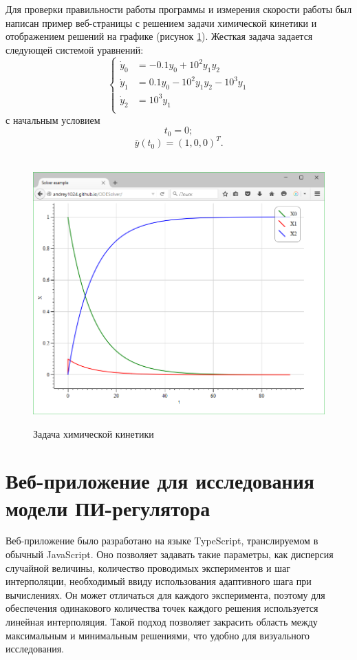 \documentclass[oneside,final,14pt]{extreport}
\begin{document}
Для проверки правильности работы программы и измерения скорости работы был написан пример веб-страницы с решением задачи химической кинетики и отображением решений на графике (рисунок \ref{graph}). Жесткая задача задается следующей системой уравнений:
\[
\left\{
\begin{aligned}
	\dot y_0 &= -0.1y_0+10^2y_1y_2\\ 
	\dot y_1 &= 0.1y_0-10^2y_1y_2-10^3y_1\\
	\dot y_2 &= 10^3y_1\\
\end{aligned}
\right.
\]
с начальным условием 
\[
t_0=0;
\]
\[
\bar y(t_0)=(1,0,0)^T.
\]

\begin{figure}[h]
	\centering
\	\includegraphics[width=1\textwidth]{graph}
	\caption{Задача химической кинетики}
	\label{graph}
\end{figure}



\section{Веб-приложение для исследования модели ПИ-регулятора}
Веб-приложение было разработано на языке TypeScript, транслируемом в обычный JavaScript. Оно позволяет задавать такие параметры, как дисперсия случайной величины, количество проводимых экспериментов и шаг интерполяции, необходимый ввиду использования адаптивного шага при вычислениях. Он может отличаться для каждого эксперимента, поэтому для  обеспечения одинакового количества точек каждого решения используется линейная интерполяция.  Такой подход позволяет закрасить область между максимальным и минимальным решениями, что удобно для визуального исследования.
\end{document}
